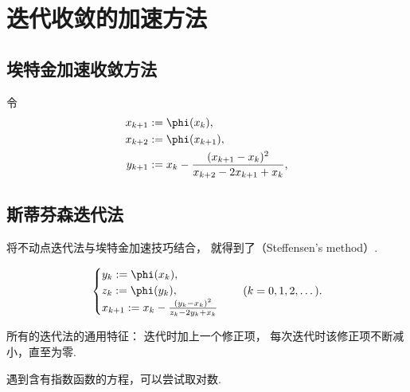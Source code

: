 \section{迭代收敛的加速方法}
\subsection{埃特金加速收敛方法}


令\begin{align*}
	x_{k+1} &\defeq \phi(x_k), \\
	x_{k+2} &\defeq \phi(x_{k+1}), \\
	y_{k+1} &\defeq x_k - \frac{(x_{k+1} - x_k)^2}{x_{k+2} - 2 x_{k+1} + x_k},
\end{align*}

\subsection{斯蒂芬森迭代法}
将不动点迭代法与埃特金加速技巧结合，
就得到了（Steffensen's method）.


\begin{align*}
	\begin{cases}
		y_k \defeq \phi(x_k), \\
		z_k \defeq \phi(y_k), \\
		x_{k+1} \defeq x_k - \frac{(y_k - x_k)^2}{z_k - 2 y_k + x_k}
	\end{cases}
	\quad(k=0,1,2,\dotsc).
\end{align*}


所有的迭代法的通用特征：
迭代时加上一个修正项，
每次迭代时该修正项不断减小，直至为零.


遇到含有指数函数的方程，可以尝试取对数.
